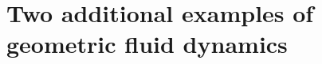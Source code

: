 \documentclass[11pt, oneside]{article}   	%
\numberwithin{equation}{section}
\theoremstyle{plain}
\theoremstyle{definition}
\theoremstyle{remark}
\newtheorem{remark}[theorem]{Remark}
\newcommand{\<}{\langle}
\renewcommand{\>}{\rangle}
\begin{document}
%
%
%
%
%


\section{Two additional examples of geometric fluid dynamics}
\end{document}
